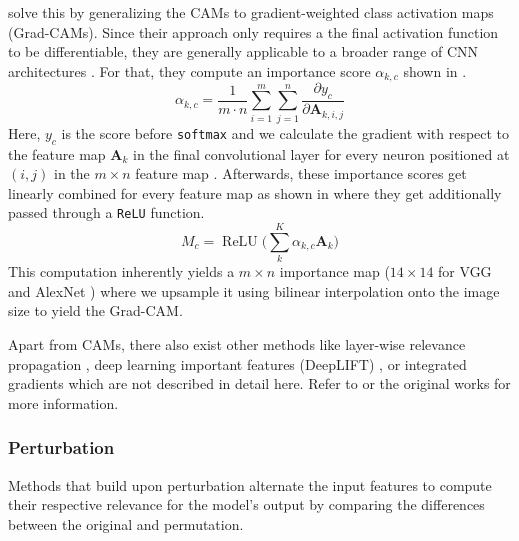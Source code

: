 \citet{SelvarajuCDVPB17} solve this by generalizing the CAMs to gradient-weighted class activation maps (Grad-CAMs). Since their approach only requires a the final activation function to be differentiable, they are generally applicable to a broader range of CNN architectures \citep{SelvarajuCDVPB17, xie2020explainable}. For that, they compute an importance score $\alpha_{k,c}$ shown in .
\begin{equation}
\label{eq:grad_cam_importance}
    \alpha_{k,c} = \frac{1}{m\cdot n}\sum_{i=1}^m\sum_{j=1}^n \frac{\partial y_c}{\partial \mathbf{A}_{k,i,j}}
\end{equation}
Here, $y_c$ is the score before \texttt{softmax} and we calculate the gradient with respect to the feature map $\mathbf{A}_k$ in the final convolutional layer for every neuron positioned at $(i,j)$ in the $m\times n$ feature map \citep{SelvarajuCDVPB17, xie2020explainable}. Afterwards, these importance scores get linearly combined for every feature map as shown in  where they get additionally passed through a \texttt{ReLU} function.
\begin{equation}
\label{eq:grad_cam_map}
    M_c = \operatorname{ReLU}\Big(\sum_k^K \alpha_{k,c} \mathbf{A}_k \Big)
\end{equation}
This computation inherently yields a $m \times n$ importance map ($14 \times 14$ for VGG \citep{SimonyanZ14a} and AlexNet \citep{KrizhevskySH12}) where we upsample it using bilinear interpolation onto the image size to yield the Grad-CAM.

Apart from CAMs, there also exist other methods like layer-wise relevance propagation \citep{MontavonLBSM17, DingLLS17, LapuschkinBMMS16, Bach2015}, deep learning important features (DeepLIFT) \citep{ShrikumarGK17}, or integrated gradients \citep{SundararajanTY17} which are not described in detail here. Refer to \citet{xie2020explainable} or the original works for more information.

\subsubsection{Perturbation}
Methods that build upon perturbation alternate the input features to compute their respective relevance for the model's output by comparing the differences between the original and permutation.

